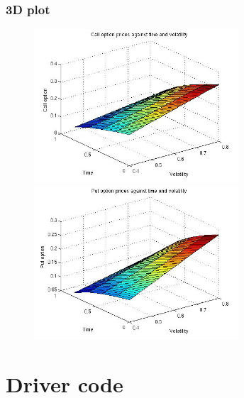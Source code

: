 \documentclass[12pt]{article}
\begin{document}
    \subsubsection*{3D plot}
    \begin{figure}[ht]
    \centering
      \begin{minipage}{.45\textwidth}
        \centering
        \includegraphics[width=3in]{call-time-vol.jpg}
      \end{minipage}
      \begin{minipage}{.45\textwidth}
        \centering
        \includegraphics[width=3in]{put-time-vol.jpg}
      \end{minipage}
    \end{figure}

\newpage
\section{Driver code}
  
\end{document}
